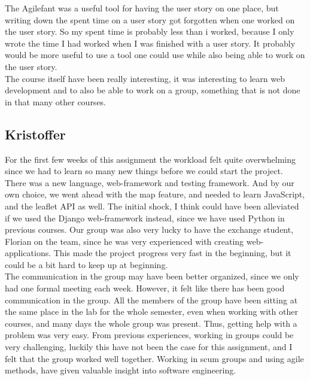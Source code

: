 \documentclass[a4paper]{article}
\begin{document}
\noindent
The Agilefant was a useful tool for having the user story on one place, but writing down the spent time on a user story got forgotten when one worked on the user story. So my spent time is probably less than i worked, because I only wrote the time I had worked when I was finished with a user story. It probably would be more useful to use a tool one could use while also being able to work on the user story. \\

\noindent
The course itself have been really interesting, it was interesting to learn web development and to  also be able to work on a group, something that is not done in that many other courses.

\subsection{Kristoffer}
\noindent
For the first few weeks of this assignment the workload felt quite overwhelming since we had to learn so many new things before we could start the project. There was a new language, web-framework and testing framework. And by our own choice, we went ahead with the map feature, and needed to learn JavaScript, and the leaflet API as well.  
The initial shock, I think could have been alleviated if we used the Django web-framework instead, since we have used Python in previous courses.
Our group was also very lucky to have the exchange student, Florian on the team, since he was very experienced with creating web-applications. This made the project progress very fast in the beginning, but it could be a bit hard to keep up at beginning. \\

\noindent
The communication in the group may have been better organized, since we only had one formal meeting each week. However, it felt like there has been good communication in the group. All the members of the group have been sitting at the same place in the lab for the whole semester, even when working with other courses, and many days the whole group was present. Thus, getting help with a problem was very easy.
From previous experiences, working in groups could be very challenging, luckily this have not been the case for this assignment, and I felt that the group worked well together. Working in scum groups and using agile methods, have given valuable insight into software engineering.  \\
\end{document}
